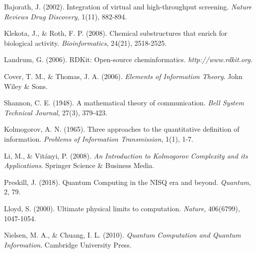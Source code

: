 \documentclass[12pt,a4paper]{article}
\begin{document}
\begin{thebibliography}{99}
Bajorath, J. (2002). Integration of virtual and high-throughput screening. \textit{Nature Reviews Drug Discovery}, 1(11), 882-894.

Klekota, J., \& Roth, F. P. (2008). Chemical substructures that enrich for biological activity. \textit{Bioinformatics}, 24(21), 2518-2525.

Landrum, G. (2006). RDKit: Open-source cheminformatics. \textit{http://www.rdkit.org}.

Cover, T. M., \& Thomas, J. A. (2006). \textit{Elements of Information Theory}. John Wiley \& Sons.

Shannon, C. E. (1948). A mathematical theory of communication. \textit{Bell System Technical Journal}, 27(3), 379-423.

Kolmogorov, A. N. (1965). Three approaches to the quantitative definition of information. \textit{Problems of Information Transmission}, 1(1), 1-7.

Li, M., \& Vitányi, P. (2008). \textit{An Introduction to Kolmogorov Complexity and its Applications}. Springer Science \& Business Media.

Preskill, J. (2018). Quantum Computing in the NISQ era and beyond. \textit{Quantum}, 2, 79.

Lloyd, S. (2000). Ultimate physical limits to computation. \textit{Nature}, 406(6799), 1047-1054.

Nielsen, M. A., \& Chuang, I. L. (2010). \textit{Quantum Computation and Quantum Information}. Cambridge University Press.

\end{thebibliography}
\end{document}
